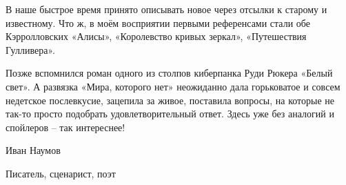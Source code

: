 В наше быстрое время принято описывать новое через отсылки к старому и
известному. Что ж, в моём восприятии первыми референсами стали обе
Кэрролловских «Алисы», «Королевство кривых зеркал», «Путешествия Гулливера».

Позже вспомнился роман одного из столпов киберпанка Руди Рюкера «Белый свет». А
развязка «Мира, которого нет» неожиданно дала горьковатое и совсем недетское
послевкусие, зацепила за живое, поставила вопросы, на которые не так-то просто
подобрать удовлетворительный ответ. Здесь уже без аналогий и спойлеров – так
интереснее!

Иван Наумов

Писатель, сценарист, поэт
